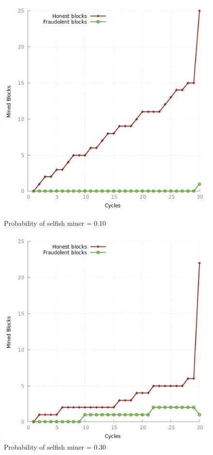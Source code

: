 \documentclass{article}
\begin{document}
\begin{figure}[!htb]
  \includegraphics[width=\linewidth]{plots/blockchain_P0.10.png}
  \caption{Probability of selfish miner = 0.10}\label{fig:bk0.10}
\endminipage\hfill
{}
  \includegraphics[width=\linewidth]{plots/blockchain_P0.30}
  \caption{Probability of selfish miner = 0.30}\label{fig:bk0.30}
\endminipage\hfill

\end{figure}
\end{document}
